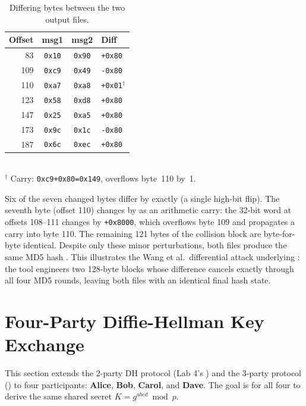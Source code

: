 \documentclass[twocolumn, 10pt]{article}
\begin{document}
\begin{table}[H]
\centering
\caption{Differing bytes between the two output files.}
\label{tab:diffbytes}
\footnotesize
\begin{tabular}{rccl}
\toprule
\textbf{Offset} & \textbf{msg1} & \textbf{msg2} & \textbf{Diff} \\
\midrule
83  & \texttt{0x10} & \texttt{0x90} & \texttt{+0x80} \\
109 & \texttt{0xc9} & \texttt{0x49} & \texttt{-0x80} \\
110 & \texttt{0xa7} & \texttt{0xa8} & \texttt{+0x01}$^\dag$ \\
123 & \texttt{0x58} & \texttt{0xd8} & \texttt{+0x80} \\
147 & \texttt{0x25} & \texttt{0xa5} & \texttt{+0x80} \\
173 & \texttt{0x9c} & \texttt{0x1c} & \texttt{-0x80} \\
187 & \texttt{0x6c} & \texttt{0xec} & \texttt{+0x80} \\
\bottomrule
\end{tabular}\\[3pt]
\footnotesize$^\dag$ Carry: \texttt{0xc9+0x80=0x149}, overflows byte~110 by~1.
\end{table}

Six of the seven changed bytes differ by exactly  (a single high-bit flip). The seventh byte (offset 110) changes by  as an arithmetic carry: the 32-bit word at offsets 108--111 changes by \texttt{+0x8000}, which overflows byte 109 and propagates a carry into byte 110. The remaining 121 bytes of the collision block are byte-for-byte identical. Despite only these minor perturbations, both files produce the same MD5 hash . This illustrates the Wang et al.\ differential attack underlying : the tool engineers two 128-byte blocks whose difference cancels exactly through all four MD5 rounds, leaving both files with an identical final hash state.

\section{Four-Party Diffie-Hellman Key Exchange}

This section extends the 2-party DH protocol (Lab 4's ) and the 3-party protocol () to four participants: \textbf{Alice}, \textbf{Bob}, \textbf{Carol}, and \textbf{Dave}. The goal is for all four to derive the same shared secret $K = g^{abcd} \bmod p$.
\end{document}
